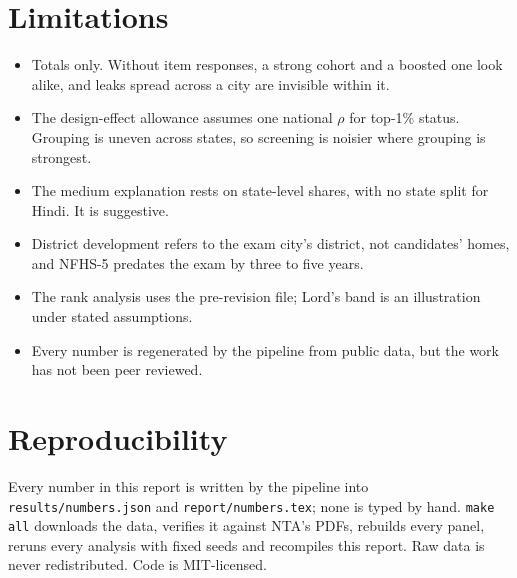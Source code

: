 \documentclass[11pt]{article}
\begin{document}
\section{Limitations}\label{sec:limits}
\begin{itemize}[leftmargin=1.2em]
\item Totals only. Without item responses, a strong cohort and a boosted one look alike, and leaks spread across a city are invisible within it.
\item The design-effect allowance assumes one national $\rho$ for top-1\% status. Grouping is uneven across states, so screening is noisier where grouping is strongest.
\item The medium explanation rests on state-level shares, with no state split for Hindi. It is suggestive.
\item District development refers to the exam city's district, not candidates' homes, and NFHS-5 predates the exam by three to five years.
\item The rank analysis uses the pre-revision file; Lord's band is an illustration under stated assumptions.
\item Every number is regenerated by the pipeline from public data, but the work has not been peer reviewed.
\end{itemize}

\section{Reproducibility}
Every number in this report is written by the pipeline into \nolinkurl{results/numbers.json} and \nolinkurl{report/numbers.tex}; none is typed by hand. \texttt{make all} downloads the data, verifies it against NTA's PDFs, rebuilds every panel, reruns every analysis with fixed seeds and recompiles this report. Raw data is never redistributed. Code is MIT-licensed.
\end{document}
